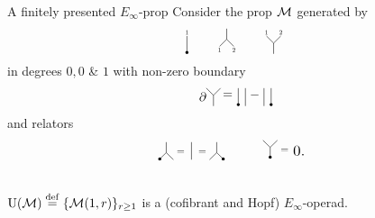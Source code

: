 \begin{frame}{A finitely presented $E_\infty$-prop}
	\pause Consider the prop $\mathcal{M}$ generated by
	\[
	\begin{tikzpicture}[scale=.4]
		\draw (0,.5)--(0,-.75);
		\node[scale=.5] at (0,.75){1};
		\fill (0,-.65) circle (3pt);
	\end{tikzpicture}
	\qquad
	\begin{tikzpicture}[scale=.4]
		\draw (0,0)--(0,.75);
		\draw (0,0)--(.5,-.5);
		\draw (0,0)--(-.5,-.5);
		\node[scale=.5] at (-.5,-.75){1};
		\node[scale=.5] at (.5,-.75){2};
	\end{tikzpicture}
	\qquad
	\begin{tikzpicture}[scale=.4]
		\draw (0,0)--(0,-.75);
		\draw (0,0)--(.5,.5);
		\draw (0,0)--(-.5,.5);
		\node[scale=.5] at (-.5,.75){1};
		\node[scale=.5] at (.5,.75){2};
	\end{tikzpicture}
	\vspace*{-2pt}
	\]
	in degrees $0, 0$ \& $1$ with non-zero boundary
	\[
	\begin{tikzpicture}[scale=.4]
		\node[scale=1] at (-.75,-.1){$\partial$};
		\draw (0,0)--(0,-.75);
		\draw (0,0)--(.5,.5);
		\draw (0,0)--(-.5,.5);
		\node[scale=1] at (1,0){$=$};
	\end{tikzpicture}
	\begin{tikzpicture}[scale=.4]
		\draw (0,.5)--(0,-.75);
		\fill (0,-.65) circle (3pt);
		\draw (.5,.5)--(.5,-.75);
		\node[scale=1] at (1.15,0){$-$};
	\end{tikzpicture}
	\begin{tikzpicture}[scale=.4]
		\draw (0,.5)--(0,-.75);
		\fill (.5,-.65) circle (3pt);
		\draw (.5,.5)--(.5,-.75);
	\end{tikzpicture}
	\]
	\vskip-5pt
	and relators
	\[
	\begin{tikzpicture}[scale=.4]
		\draw (0,0)--(0,.75);
		\draw (0,0)--(.5,-.5);
		\draw (0,0)--(-.5,-.5);
		\fill (-.45,-.45) circle (3pt);
		\node[scale=.8] at (1,0){$=$};
		\draw (1.75,.75)--(1.75,-.5);
		\node[scale=.8] at (2.5,0){$=$};
		\draw (3.5,0)--(3.5,.75);
		\draw (3.5,0)--(4,-.5);
		\draw (3.5,0)--(3,-.5);
		\fill (3.95,-.45) circle (3pt);
	\end{tikzpicture}
	\quad\qquad
	\begin{tikzpicture}[scale=.4]
		\draw (0,0)--(0,-.75);
		\draw (0,0)--(.5,.5);
		\draw (0,0)--(-.5,.5);
		\fill (0,-.7) circle (3pt);
		\node[scale=.8] at (1,-.25){$=$};
		\node[scale=1.2] at (2,-.25){$0.$};
	\end{tikzpicture}
	\]

	\medskip\pause
	 \\
	$\operatorname{U}(\mathcal{M}) \stackrel{\mathrm{def}}{=} \{\mathcal{M}(1,r)\}_{r \geq 1}$ is a (cofibrant and Hopf) $E_\infty$-operad.
\end{frame}